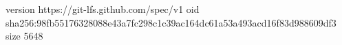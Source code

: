 version https://git-lfs.github.com/spec/v1
oid sha256:98fb55176328088e43a7fc298c1c39ac164dc61a53a493acd16f83d988609df3
size 5648
